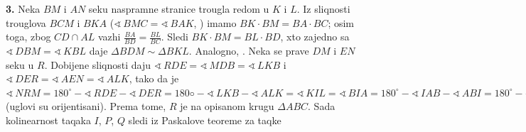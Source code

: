 \documentclass[11pt,letter]{article}
\newcommand\texteng{\fontencoding{OT1}\fontfamily{\rmdefault}\selectfont}
\def\ug{\mathbin{\sphericalangle\,}}
\newcommand{\D}{\displaystyle}
\begin{document}
\textbf{3.} Neka $BM$ i $AN$ seku naspramne \text stranice trougla redom u $K$ i $L$. Iz sliqnosti \text trouglova $BCM$ i $BKA$ ($\ug BMC =\ug BAK$, \text{$\ug CBM =\ug KBA$}) imamo $BK \cdot BM = BA \cdot BC$; osim toga, zbog $CD\cap  AL$ vazhi $\D\frac{BA}{BD} =\frac{BL}{BC}$. Sledi $BK \cdot BM = BL \cdot BD$, xto zajedno sa $\ug DBM =\ug KBL$ daje $\Delta BDM \sim \Delta BKL$. Analogno, . Neka se prave $DM$ i $EN$ seku u $R$. Dobijene sliqnosti daju $\ug RDE =\ug MDB =\ug LKB$ i $\ug DER =\ug AEN =\ug ALK$, tako da je $\ug NRM = 180^{\circ} - \ug RDE - \ug DER = 180◦ -\ug LKB - \ug ALK = \ug KIL = \ug BIA =  180^{\circ} - \ug IAB - \ug ABI = 180^{\circ} - \ug CAN - \ug MBC = \ug NCM$ (uglovi su orijentisani). Prema tome, $R$ je na opisanom krugu $\Delta ABC$. Sada kolinearnost taqaka $I$, $P$, $Q$ sledi iz Paskalove teoreme za taqke 

\end{document}
